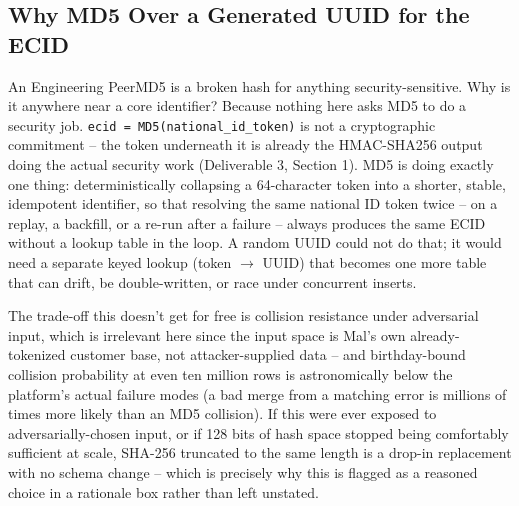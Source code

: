\documentclass[11pt]{article}
\begin{document}
\subsection{Why MD5 Over a Generated UUID for the ECID}
\begin{stakeholderq}{An Engineering Peer}{MD5 is a broken hash for anything security-sensitive. Why is it anywhere near a core identifier?}
Because nothing here asks MD5 to do a security job. \texttt{ecid = MD5(national\_id\_token)} is not a cryptographic commitment -- the token underneath it is already the HMAC-SHA256 output doing the actual security work (Deliverable 3, Section 1). MD5 is doing exactly one thing: deterministically collapsing a 64-character token into a shorter, stable, idempotent identifier, so that resolving the same national ID token twice -- on a replay, a backfill, or a re-run after a failure -- always produces the same ECID without a lookup table in the loop. A random UUID could not do that; it would need a separate keyed lookup (token $\rightarrow$ UUID) that becomes one more table that can drift, be double-written, or race under concurrent inserts.

The trade-off this doesn't get for free is collision resistance under adversarial input, which is irrelevant here since the input space is Mal's own already-tokenized customer base, not attacker-supplied data -- and birthday-bound collision probability at even ten million rows is astronomically below the platform's actual failure modes (a bad merge from a matching error is millions of times more likely than an MD5 collision). If this were ever exposed to adversarially-chosen input, or if 128 bits of hash space stopped being comfortably sufficient at scale, SHA-256 truncated to the same length is a drop-in replacement with no schema change -- which is precisely why this is flagged as a reasoned choice in a rationale box rather than left unstated.
\end{stakeholderq}
\end{document}

